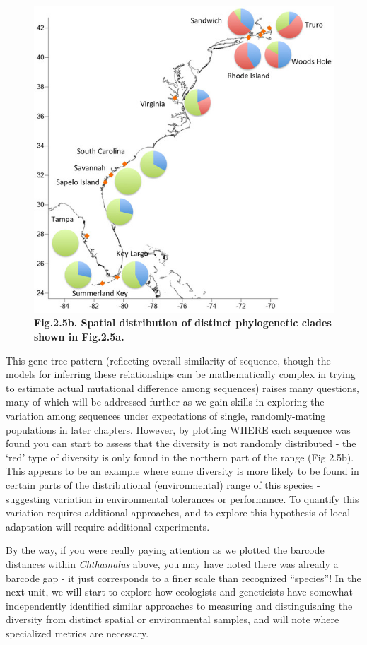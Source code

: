 \documentclass[
]{article}
\begin{document}
\begin{figure}
\centering
\includegraphics{MEImages/fig-3-1x-3.jpg}
\caption{\textbf{Fig.2.5b. Spatial distribution of distinct phylogenetic
clades shown in Fig.2.5a.}}
\end{figure}

This gene tree pattern (reflecting overall similarity of sequence,
though the models for inferring these relationships can be
mathematically complex in trying to estimate actual mutational
difference among sequences) raises many questions, many of which will be
addressed further as we gain skills in exploring the variation among
sequences under expectations of single, randomly-mating populations in
later chapters. However, by plotting WHERE each sequence was found you
can start to assess that the diversity is not randomly distributed - the
`red' type of diversity is only found in the northern part of the range
(Fig 2.5b). This appears to be an example where some diversity is more
likely to be found in certain parts of the distributional
(environmental) range of this species - suggesting variation in
environmental tolerances or performance. To quantify this variation
requires additional approaches, and to explore this hypothesis of local
adaptation will require additional experiments.

By the way, if you were really paying attention as we plotted the
barcode distances within \emph{Chthamalus} above, you may have noted
there was already a barcode gap - it just corresponds to a finer scale
than recognized ``species''! In the next unit, we will start to explore
how ecologists and geneticists have somewhat independently identified
similar approaches to measuring and distinguishing the diversity from
distinct spatial or environmental samples, and will note where
specialized metrics are necessary.
\end{document}

